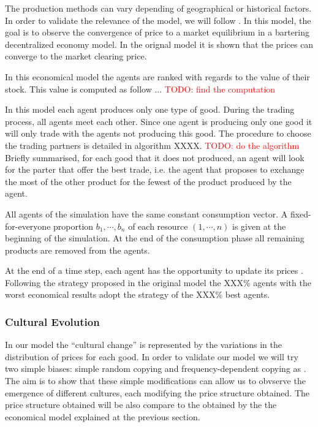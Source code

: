 \documentclass{wscpaperproc}
\newcommand{\memo}[2]{\textcolor{#1}{#2}}
\newcommand{\todo}[1]{\memo{red}{TODO: #1\\}}
\begin{document}
The production methods can vary depending of geographical or historical factors. In order to validate the relevance of the model, we will follow \cite{gintis_emergence_2006}. In this model, the goal is to observe the convergence of price to a market equilibrium in a bartering decentralized economy model. In the orignal model it is shown that the prices can converge to the market clearing price.

In this economical model the agents are ranked with regards to the value of their stock. This value is computed as follow ...
\todo{find the computation}

In this model each agent produces only one type of good. During the trading process, all agents meet each other. Since one agent is producing only one good it will only trade with the agents not producing this good. The procedure to choose the trading partners is detailed in algorithm XXXX.
\todo{do the algorithm}
Briefly summarised, for each good that it does not produced, an agent will look for the parter that offer the best trade, i.e. the agent that proposes to exchange the most of the other product for the fewest of the product produced by the agent.

All agents of the simulation have the same constant consumption vector. A fixed-for-everyone proportion $b_1,\cdots,b_n$ of each resource $(1, \cdots, n)$ is given at the beginning of the simulation. At the end of the consumption phase all remaining products are removed from the agents.

At the end of a time step, each agent has the opportunity to update its prices . Following the strategy proposed in the original model the XXX\% agents with the worst economical results adopt the strategy of the XXX\% best agents.


\subsubsection{Cultural Evolution}

In our model the ``cultural change'' is represented by the variations in the distribution of prices for each good. In order to validate our model we will try two simple biases: simple random copying and frequency-dependent copying as \cite{mesoudi_random_2009}. The aim is to show that these simple modifications can allow us to obvserve the emergence of different cultures, each modifying the price structure obtained. The price structure obtained will be also compare to the obtained by the the economical model explained at the previous section.
\end{document}
